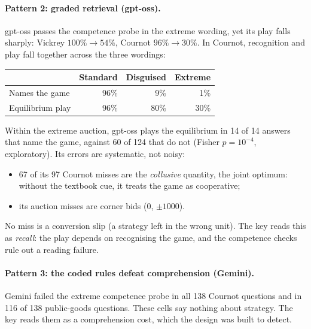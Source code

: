 \documentclass[10pt]{article}
\theoremstyle{definition}
\theoremstyle{remark}
\begin{document}
\paragraph{Pattern 2: graded retrieval (gpt-oss).} gpt-oss passes the competence probe in the
extreme wording, yet its play falls sharply: Vickrey $100\%\to54\%$, Cournot $96\%\to30\%$. In
Cournot, recognition and play fall together across the three wordings:

\begin{center}
\small
\begin{tabular}{@{}lrrr@{}}
\toprule
 & Standard & Disguised & Extreme \\
\midrule
Names the game & 96\% & 9\% & 1\% \\
Equilibrium play & 96\% & 80\% & 30\% \\
\bottomrule
\end{tabular}
\end{center}

\noindent Within the extreme auction, gpt-oss plays the equilibrium in 14 of 14 answers that
name the game, against 60 of 124 that do not (Fisher $p=10^{-4}$, exploratory). Its errors are
systematic, not noisy:
\begin{itemize}
\item 67 of its 97 Cournot misses are the \emph{collusive} quantity, the joint optimum: without
  the textbook cue, it treats the game as cooperative;
\item its auction misses are corner bids (0, $\pm1000$).
\end{itemize}
No miss is a conversion slip (a strategy left in the wrong unit). The key reads this as
\emph{recall}: the play depends on recognising the game, and the competence checks rule out a
reading failure.

\paragraph{Pattern 3: the coded rules defeat comprehension (Gemini).} Gemini failed the extreme
competence probe in all 138 Cournot questions and in 116 of 138 public-goods questions. These
cells say nothing about strategy. The key reads them as a comprehension cost, which the design
was built to detect.
\end{document}
